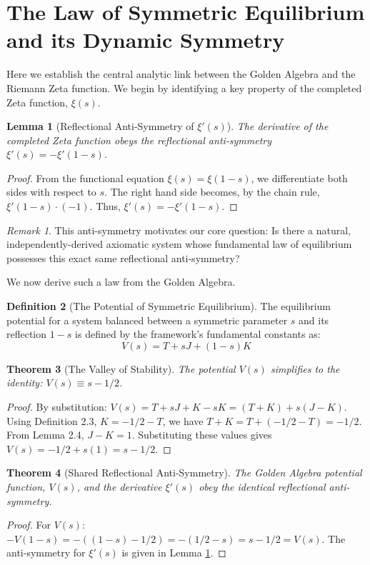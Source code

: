 \documentclass{article}
\theoremstyle{plain}
\newtheorem{theorem}{Theorem}[section]
\newtheorem{lemma}[theorem]{Lemma}
\theoremstyle{definition}
\newtheorem{definition}[theorem]{Definition}
\theoremstyle{remark}
\newtheorem*{remark}{Remark}
\begin{document}
\section{The Law of Symmetric Equilibrium and its Dynamic Symmetry}
Here we establish the central analytic link between the Golden Algebra and the Riemann Zeta function. We begin by identifying a key property of the completed Zeta function, $\xi(s)$.

\begin{lemma}[Reflectional Anti-Symmetry of $\xi'(s)$]
\label{thm:xi_anti_symmetry}
The derivative of the completed Zeta function obeys the reflectional anti-symmetry $\xi'(s) = -\xi'(1-s)$.
\end{lemma}
\begin{proof}
From the functional equation $\xi(s) = \xi(1-s)$, we differentiate both sides with respect to $s$. The right hand side becomes, by the chain rule, $\xi'(1-s) \cdot (-1)$. Thus, $\xi'(s) = -\xi'(1-s)$.
\end{proof}

\begin{remark}
This anti-symmetry motivates our core question: Is there a natural, independently-derived axiomatic system whose fundamental law of equilibrium possesses this exact same reflectional anti-symmetry?
\end{remark}

We now derive such a law from the Golden Algebra.

\begin{definition}[The Potential of Symmetric Equilibrium]
The equilibrium potential for a system balanced between a symmetric parameter $s$ and its reflection $1-s$ is defined by the framework's fundamental constants as:
$$V(s) = T + sJ + (1-s)K$$
\end{definition}

\begin{theorem}[The Valley of Stability]
The potential $V(s)$ simplifies to the identity: $V(s) \equiv s - 1/2$.
\end{theorem}
\begin{proof}
By substitution: $V(s) = T + sJ + K - sK = (T+K) + s(J-K)$. Using Definition 2.3, $K=-1/2-T$, we have $T+K = T+(-1/2-T) = -1/2$. From Lemma 2.4, $J-K=1$. Substituting these values gives $V(s) = -1/2 + s(1) = s - 1/2$.
\end{proof}

\begin{theorem}[Shared Reflectional Anti-Symmetry]
The Golden Algebra potential function, $V(s)$, and the derivative $\xi'(s)$ obey the identical reflectional anti-symmetry.
\end{theorem}
\begin{proof}
For $V(s)$: $-V(1-s) = -((1-s) - 1/2) = -(1/2 - s) = s - 1/2 = V(s)$. The anti-symmetry for $\xi'(s)$ is given in Lemma \ref{thm:xi_anti_symmetry}.
\end{proof}
\end{document}
